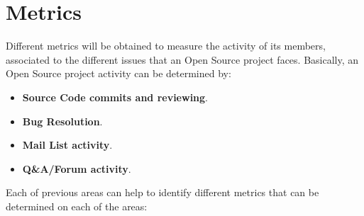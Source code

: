 \documentclass[a4paper, 12pt]{book}
\begin{document}
\section{Metrics}
\label{sec:odl_projeval_metrics}
Different metrics will be obtained to measure the activity of its members, associated to the different issues that an Open Source project faces. Basically, an Open Source project activity can be determined by:
\begin{itemize}\itemsep0pt
\item{\textbf{Source Code commits and reviewing}}.
\item{\textbf{Bug Resolution}}.
\item{\textbf{Mail List activity}}.
\item{\textbf{Q\&A/Forum activity}}.
\end{itemize}
Each of previous areas can help to identify different metrics that can be determined on each of the areas:
\end{document}
